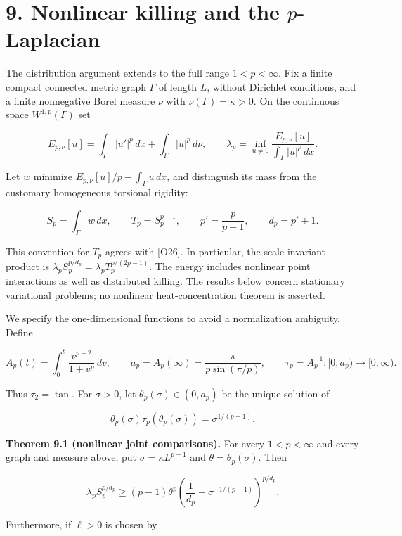 \documentclass[11pt]{article}
\begin{document}
\section{\texorpdfstring{9. Nonlinear killing and the
\(p\)-Laplacian}{9. Nonlinear killing and the p-Laplacian}}\label{nonlinear-killing-and-the-p-laplacian}

The distribution argument extends to the full range \(1<p<\infty\). Fix
a finite compact connected metric graph \(\Gamma\) of length \(L\),
without Dirichlet conditions, and a finite nonnegative Borel measure
\(\nu\) with \(\nu(\Gamma)=\kappa>0\). On the continuous space
\(W^{1,p}(\Gamma)\) set

\[
E_{p,\nu}[u]=\int_\Gamma|u'|^p\,dx+\int_\Gamma|u|^p\,d\nu,
\qquad
\lambda_p=\inf_{u\ne0}\frac{E_{p,\nu}[u]}{\int_\Gamma|u|^p\,dx}.
\tag{89}
\]

Let \(w\) minimize \(E_{p,\nu}[u]/p-\int_\Gamma u\,dx\), and distinguish
its mass from the customary homogeneous torsional rigidity:

\[
S_p=\int_\Gamma w\,dx,\qquad T_p=S_p^{p-1},
\qquad p'=\frac p{p-1},\qquad d_p=p'+1.
\tag{90}
\]

This convention for \(T_p\) agrees with {[}O26{]}. In particular, the
scale-invariant product is
\(\lambda_p S_p^{p/d_p}=\lambda_p T_p^{p/(2p-1)}\). The energy includes
nonlinear point interactions as well as distributed killing. The results
below concern stationary variational problems; no nonlinear
heat-concentration theorem is asserted.

We specify the one-dimensional functions to avoid a normalization
ambiguity. Define

\[
A_p(t)=\int_0^t\frac{v^{p-2}}{1+v^p}\,dv,
\qquad a_p=A_p(\infty)=\frac{\pi}{p\sin(\pi/p)},
\qquad \tau_p=A_p^{-1}:[0,a_p)\longrightarrow[0,\infty).
\tag{91}
\]

Thus \(\tau_2=\tan\). For \(\sigma>0\), let
\(\theta_p(\sigma)\in(0,a_p)\) be the unique solution of

\[
\theta_p(\sigma)\tau_p(\theta_p(\sigma))
=\sigma^{1/(p-1)}.
\tag{92}
\]

\textbf{Theorem 9.1 (nonlinear joint comparisons).} For every
\(1<p<\infty\) and every graph and measure above, put
\(\sigma=\kappa L^{p-1}\) and \(\theta=\theta_p(\sigma)\). Then

\[
\lambda_p S_p^{p/d_p}
\ge(p-1)\theta^p
\left(\frac1{d_p}+\sigma^{-1/(p-1)}\right)^{p/d_p}.
\tag{93}
\]

Furthermore, if \(\ell>0\) is chosen by
\end{document}
